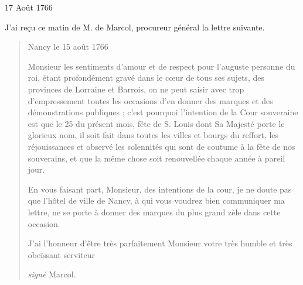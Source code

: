                      \begin{diary}{17 Août 1766}{}

                         J'ai reçu ce matin de M. de Marcol, procureur général
                           la lettre suivante. \bigskip


                        \begin{quote}\begin{flushright}Nancy
                                 le 15 août 1766\end{flushright}\bigskip

                     Monsieur les sentiments d'amour et de respect
                              pour l'auguste personne du
                                 roi, étant profondément
                              gravé dans le cœur de tous ses sujets, des provinces
                              de Lorraine et Barrois, on ne peut saisir avec trop
                              d'empressement toutes les occasions d'en donner des
                              marques et des démonstrations publiques ; c'est
                              pourquoi l'intention de la Cour
                                 souveraine est que
                              le 25 du présent mois, fête de S.
                              Louis dont Sa Majesté
                              porte le glorieux nom, il soit fait dans toutes les
                              villes et bourgs du reffort, les réjouissances et
                              observé les solennités qui sont de coutume à la
                              fête de nos souverains, et que la même chose soit
                              renouvellée chaque année à pareil jour. \bigskip

         En vous faisant part, Monsieur, des intentions
                              de la cour, je ne doute pas que l'hôtel de
                                 ville de
                                 Nancy, à qui vous voudrez bien communiquer ma lettre, ne se porte à donner des marques du
                              plus grand zèle dans cette occasion. \bigskip

         J'ai l'honneur d'être très parfaitement
                                 Monsieur votre très humble et très obeïssant
                                 serviteur \begin{flushright}\emph{signé}
                                 Marcol.\end{flushright}\end{quote}
                     \end{diary}

